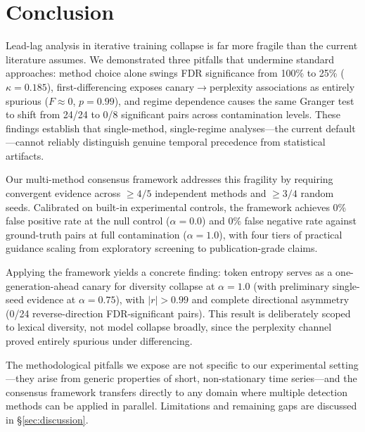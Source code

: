 \section{Conclusion}
\label{sec:conclusion}

Lead-lag analysis in iterative training collapse is far more fragile than the current literature assumes.
We demonstrated three pitfalls that undermine standard approaches: method choice alone swings FDR significance from 100\% to 25\% ($\kappa{=}0.185$), first-differencing exposes canary$\to$perplexity associations as entirely spurious ($F{\approx}0$, $p{=}0.99$), and regime dependence causes the same Granger test to shift from 24/24 to 0/8 significant pairs across contamination levels.
These findings establish that single-method, single-regime analyses---the current default---cannot reliably distinguish genuine temporal precedence from statistical artifacts.

Our multi-method consensus framework addresses this fragility by requiring convergent evidence across ${\geq}4/5$ independent methods and ${\geq}3/4$ random seeds.
Calibrated on built-in experimental controls, the framework achieves 0\% false positive rate at the null control ($\alpha{=}0.0$) and 0\% false negative rate against ground-truth pairs at full contamination ($\alpha{=}1.0$), with four tiers of practical guidance scaling from exploratory screening to publication-grade claims.

Applying the framework yields a concrete finding: token entropy serves as a one-generation-ahead canary for diversity collapse at $\alpha{=}1.0$ (with preliminary single-seed evidence at $\alpha{=}0.75$), with $|r|{>}0.99$ and complete directional asymmetry (0/24 reverse-direction FDR-significant pairs).
This result is deliberately scoped to lexical diversity, not model collapse broadly, since the perplexity channel proved entirely spurious under differencing.

The methodological pitfalls we expose are not specific to our experimental setting---they arise from generic properties of short, non-stationary time series---and the consensus framework transfers directly to any domain where multiple detection methods can be applied in parallel.
Limitations and remaining gaps are discussed in \S\ref{sec:discussion}.